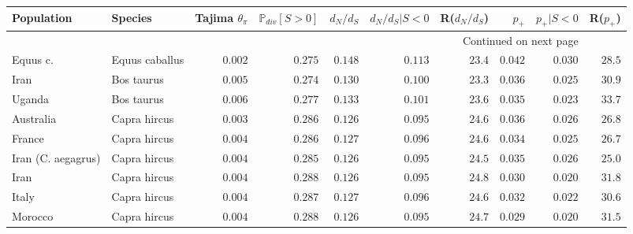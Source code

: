 \documentclass{article}
\newcommand{\dn}{d_N}
\newcommand{\ds}{d_S}
\newcommand{\dnds}{\dn / \ds}
\newcommand{\Sphy}{S}
\begin{document}
    \begin{center}
        \scriptsize
        \begin{longtable}{|l|l|r|r|r|r|r|r|r|r|}
            \toprule
            Population           & Species             & Tajima $\theta_{\pi}$ & $\mathbb{P}_{div}[\Sphy > 0]$ & $\dnds $ & $\dnds  | S<0$ & R($\dnds $) & $p_+ $ & $p_+  | S<0$ & R($p_+ $) \\
            \midrule
            \endhead
            \midrule
            \multicolumn{9}{r}{{Continued on next page}} \\
            \midrule
            \endfoot

            \bottomrule
            \endlastfoot
            Equus c.             & Equus caballus      & $ 0.002$              & $ 0.275$                      & $ 0.148$ & $ 0.113$     & $  23.4$      & $ 0.042$ & $ 0.030$ & $  28.5$ \\
            Iran                 & Bos taurus          & $ 0.005$              & $ 0.274$                      & $ 0.130$ & $ 0.100$     & $  23.3$      & $ 0.036$ & $ 0.025$   & $  30.9$    \\
            Uganda               & Bos taurus          & $ 0.006$              & $ 0.277$                      & $ 0.133$ & $ 0.101$     & $  23.6$      & $ 0.035$ & $ 0.023$   & $  33.7$    \\
            Australia            & Capra hircus        & $ 0.003$              & $ 0.286$                      & $ 0.126$ & $ 0.095$     & $  24.6$      & $ 0.036$ & $ 0.026$ & $  26.8$ \\
            France               & Capra hircus        & $ 0.004$              & $ 0.286$                      & $ 0.127$ & $ 0.096$     & $  24.6$      & $ 0.034$ & $ 0.025$ & $  26.7$ \\
            Iran (C. aegagrus)   & Capra hircus        & $ 0.004$              & $ 0.285$                      & $ 0.126$ & $ 0.095$     & $  24.5$      & $ 0.035$ & $ 0.026$ & $  25.0$ \\
            Iran                 & Capra hircus        & $ 0.004$              & $ 0.288$                      & $ 0.126$ & $ 0.095$     & $  24.8$      & $ 0.030$ & $ 0.020$   & $  31.8$    \\
            Italy                & Capra hircus        & $ 0.004$              & $ 0.287$                      & $ 0.127$ & $ 0.096$     & $  24.6$      & $ 0.032$ & $ 0.022$   & $  30.6$    \\
            Morocco              & Capra hircus        & $ 0.004$              & $ 0.288$                      & $ 0.126$ & $ 0.095$     & $  24.7$      & $ 0.029$ & $ 0.020$ & $  31.5$ \\

\end{longtable}
\end{center}
\end{document}
